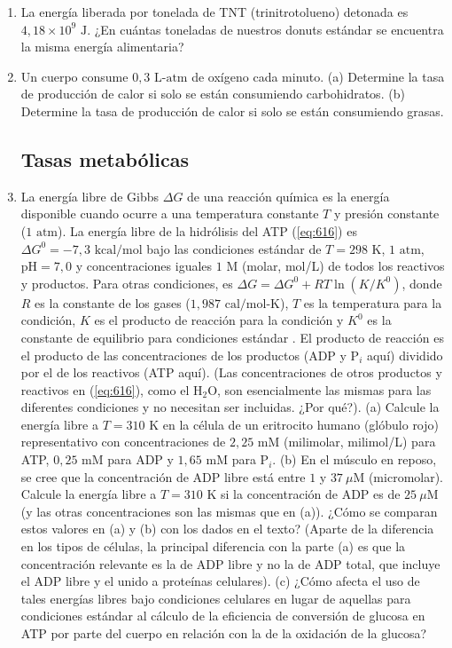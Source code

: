 \documentclass[12pt]{book}
\begin{document}
\begin{enumerate}
\item[6.30] La energía liberada por tonelada de TNT (trinitrotolueno) detonada es $4{,}18 \times 10^9\text{ J}$. ¿En cuántas toneladas de nuestros donuts estándar se encuentra la misma energía alimentaria?

\item[6.31] Un cuerpo consume $0{,}3\text{ L-atm}$ de oxígeno cada minuto. (a) Determine la tasa de producción de calor si solo se están consumiendo carbohidratos. (b) Determine la tasa de producción de calor si solo se están consumiendo grasas.

\subsection*{Tasas metabólicas}

\item[6.32] La energía libre de Gibbs $\Delta G$ de una reacción química es la energía disponible cuando ocurre a una temperatura constante $T$ y presión constante ($1\text{ atm}$). La energía libre de la hidrólisis del ATP (\ref{eq:616}) es $\Delta G^0 = -7{,}3\text{ kcal/mol}$ bajo las condiciones estándar de $T = 298\text{ K}$, $1\text{ atm}$, $\text{pH} = 7{,}0$ y concentraciones iguales $1\text{ M}$ (molar, mol/L) de todos los reactivos y productos. Para otras condiciones, es $\Delta G = \Delta G^0 + RT \ln(K/K^0)$, donde $R$ es la constante de los gases ($1{,}987\text{ cal/mol-K}$), $T$ es la temperatura para la condición, $K$ es el producto de reacción para la condición y $K^0$ es la constante de equilibrio para condiciones estándar \cite{75}. El producto de reacción es el producto de las concentraciones de los productos (ADP y $\text{P}_i$ aquí) dividido por el de los reactivos (ATP aquí). (Las concentraciones de otros productos y reactivos en (\ref{eq:616}), como el $\text{H}_2\text{O}$, son esencialmente las mismas para las diferentes condiciones y no necesitan ser incluidas. ¿Por qué?). (a) Calcule la energía libre a $T = 310\text{ K}$ en la célula de un eritrocito humano (glóbulo rojo) representativo con concentraciones de $2{,}25\text{ mM}$ (milimolar, milimol/L) para ATP, $0{,}25\text{ mM}$ para ADP y $1{,}65\text{ mM}$ para $\text{P}_i$. (b) En el músculo en reposo, se cree que la concentración de ADP libre está entre $1$ y $37\ \mu\text{M}$ (micromolar). Calcule la energía libre a $T = 310\text{ K}$ si la concentración de ADP es de $25\ \mu\text{M}$ (y las otras concentraciones son las mismas que en (a)). ¿Cómo se comparan estos valores en (a) y (b) con los dados en el texto? (Aparte de la diferencia en los tipos de células, la principal diferencia con la parte (a) es que la concentración relevante es la de ADP libre y no la de ADP total, que incluye el ADP libre y el unido a proteínas celulares). (c) ¿Cómo afecta el uso de tales energías libres bajo condiciones celulares en lugar de aquellas para condiciones estándar al cálculo de la eficiencia de conversión de glucosa en ATP por parte del cuerpo en relación con la de la oxidación de la glucosa?


\end{enumerate}
\end{document}
